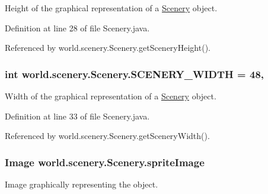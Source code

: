 Height of the graphical representation of a \hyperlink{classworld_1_1scenery_1_1_scenery}{Scenery} object. 



Definition at line 28 of file Scenery.\-java.



Referenced by world.\-scenery.\-Scenery.\-get\-Scenery\-Height().

\hypertarget{classworld_1_1scenery_1_1_scenery_affb047c028883c6d069a03ef0f1caeb8}{
\subsubsection[{S\-C\-E\-N\-E\-R\-Y\-\_\-\-W\-I\-D\-T\-H}]{\setlength{\rightskip}{0pt plus 5cm}int world.\-scenery.\-Scenery.\-S\-C\-E\-N\-E\-R\-Y\-\_\-\-W\-I\-D\-T\-H = 48\hspace{0.3cm}{\ttfamily [static]}, {\ttfamily [protected]}}}\label{classworld_1_1scenery_1_1_scenery_affb047c028883c6d069a03ef0f1caeb8}


Width of the graphical representation of a \hyperlink{classworld_1_1scenery_1_1_scenery}{Scenery} object. 



Definition at line 33 of file Scenery.\-java.



Referenced by world.\-scenery.\-Scenery.\-get\-Scenery\-Width().

\hypertarget{classworld_1_1scenery_1_1_scenery_a512d9c0a154e6843389e343d80843326}{
\subsubsection[{sprite\-Image}]{\setlength{\rightskip}{0pt plus 5cm}Image world.\-scenery.\-Scenery.\-sprite\-Image\hspace{0.3cm}{\ttfamily [protected]}}}\label{classworld_1_1scenery_1_1_scenery_a512d9c0a154e6843389e343d80843326}


Image graphically representing the object. 



